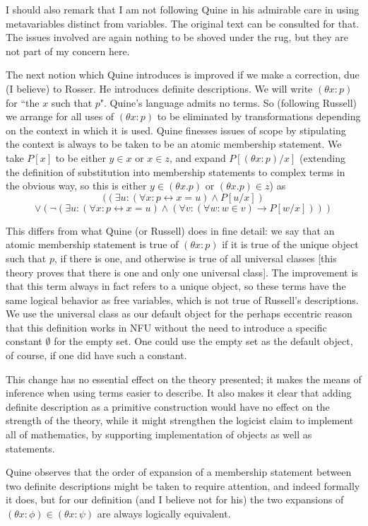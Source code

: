 \documentclass[12pt]{article}
\begin{document}
I should also remark that I am not following Quine in his admirable care in using metavariables distinct from variables.  The original text can be consulted for that.  The issues involved are again nothing to be shoved under the rug, but they are not part of my concern here.

The next notion which Quine introduces is improved if we make a correction, due (I believe) to Rosser.  He introduces definite descriptions.  We will write $(\theta x:p)$ for ``the $x$ such that $p$".  Quine's language admits no terms.  So (following Russell) we arrange for all uses of $(\theta x:p)$ to be eliminated by transformations depending on the context in which it is used.  Quine finesses issues of scope by stipulating the context is always to be taken to be an atomic membership statement.
We take $P[x]$ to be either $y \in x$ or $x \in z$, and expand $P[(\theta x:p)/x]$ (extending the definition of substitution into membership statements to complex terms in the obvious way, so this is either $y \in (\theta x.p)$ or $(\theta x.p) \in z$) as $$((\exists u:(\forall x:p \leftrightarrow x=u) \wedge P[u/x]) $$ $$\vee (\neg (\exists u:(\forall x:p \leftrightarrow x=u) \wedge (\forall v:(\forall w:w \in v)\rightarrow P[w/x])))$$

This differs from what Quine (or Russell) does in fine detail:  we say that an atomic membership statement is true of $(\theta x:p)$ if it is true of the unique object such that $p$, if there is one, and otherwise is true of all universal classes [this theory proves that there is one and only one universal class].  The improvement is that this term always in fact refers to a unique object, so these terms have the same logical behavior as free variables, which is not true of Russell's descriptions.  We use the universal class as our default object for the perhaps eccentric reason that this definition works in NFU without the need to introduce a specific constant $\emptyset$ for the empty set.  One could use the empty set as the default object, of course, if one did have such a constant.

This change has no essential effect on the theory presented;  it makes the means of inference when using terms easier to describe.  It also makes it clear that adding definite description as a primitive construction would have no effect on the strength of the theory, while it might strengthen the logicist claim to implement all of mathematics, by supporting implementation of objects as well as statements.

Quine observes that the order of expansion of a membership statement between two definite descriptions might be taken to require attention, and indeed formally it does, but for our definition (and I believe not for his) the two expansions of $(\theta x:\phi) \in (\theta x:\psi)$ are always logically equivalent.
\end{document}
